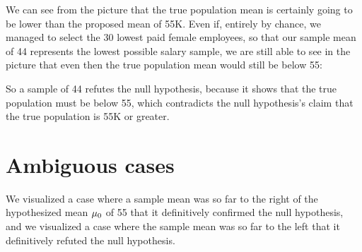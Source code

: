 \documentclass[../../../main.tex]{subfiles}
\begin{document}
\noindent
We can see from the picture that the true population mean is certainly going to be lower than the proposed mean of 55K. Even if, entirely by chance, we managed to select the 30 lowest paid female employees, so that our sample mean of 44 represents the lowest possible salary sample, we are still able to see in the picture that even then the true population mean would still be below 55:

\begin{center}
\end{center}

\noindent
So a sample of 44 refutes the null hypothesis, because it shows that the true population must be below 55, which contradicts the null hypothesis's claim that the true population is 55K or greater.


\section{Ambiguous cases}

We visualized a case where a sample mean was so far to the right of the hypothesized mean $\HypPopMean/$ of 55 that it definitively confirmed the null hypothesis, and we visualized a case where the sample mean was so far to the left that it definitively refuted the null hypothesis. 
\end{document}
